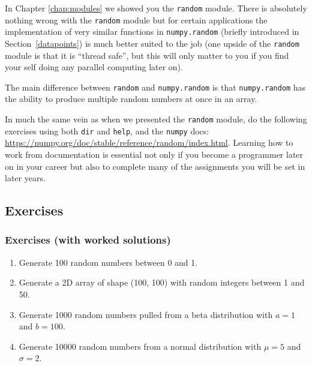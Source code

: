In Chapter \ref{chap:modules} we showed you the \texttt{random} module. There is absolutely nothing wrong with the \texttt{random} module but for certain applications the implementation of very similar functions in \texttt{numpy.random} (briefly introduced in Section~\ref{datapoints}) is much better suited to the job (one upside of the \texttt{random} module is that it is ``thread safe'', but this will only matter to you if you find your self doing any parallel computing later on).

The main difference between \texttt{random} and \texttt{numpy.random} is that \texttt{numpy.random} has the ability to produce multiple random numbers at once in an array.

In much the same vein as when we presented the \texttt{random} module, do the following exercises using both \texttt{dir} and \texttt{help}, and the \texttt{numpy} docs: \url{https://numpy.org/doc/stable/reference/random/index.html}. Learning how to work from documentation is essential not only if you become a programmer later on in your career but also to complete many of the assignments you will be set in later years.

\subsection{Exercises}

\subsubsection{Exercises (with worked solutions)} \label{sec:exc_random}
\begin{enumerate}
\item Generate 100 random numbers between 0 and 1.
\item Generate a 2D array of shape (100, 100) with random integers between 1 and 50.
\item Generate 1000 random numbers pulled from a beta distribution with $a=1$ and $b=100$.
\item Generate 10000 random numbers from a normal distribution with $\mu=5$ and $\sigma=2$.
\end{enumerate}

